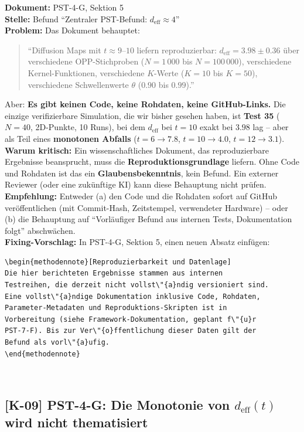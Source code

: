 \documentclass[11pt,a4paper]{article}
\newcommand{\K}[1]{\textbf{[K-#1]}}
\newcommand{\Dok}[1]{\textbf{Dokument:} #1\\}
\newcommand{\Stelle}[1]{\textbf{Stelle:} #1\\}
\newcommand{\Prob}[1]{\textbf{Problem:} #1\\}
\newcommand{\Krit}[1]{\textbf{Warum kritisch:} #1\\}
\newcommand{\Empf}[1]{\textbf{Empfehlung:} #1\\}
\newcommand{\Fix}[1]{\textbf{Fixing-Vorschlag:} #1\\}
\begin{document}
\Dok{PST-4-G, Sektion 5}
\Stelle{Befund ``Zentraler PST-Befund: $d_{\text{eff}} \approx 4$''}
\Prob{Das Dokument behauptet:
\begin{quote}
``Diffusion Maps mit $t \approx 9$--$10$ liefern reproduzierbar:
$d_{\text{eff}} = 3.98 \pm 0.36$ \"{u}ber verschiedene OPP-Stichproben
($N = 1\,000$ bis $N = 100\,000$), verschiedene Kernel-Funktionen,
verschiedene $K$-Werte ($K = 10$ bis $K = 50$), verschiedene
Schwellenwerte $\theta$ ($0.90$ bis $0.99$).''
\end{quote}
Aber: \textbf{Es gibt keinen Code, keine Rohdaten, keine
GitHub-Links.} Die einzige verifizierbare Simulation, die wir bisher
gesehen haben, ist \textbf{Test 35} ($N = 40$, 2D-Punkte, 10 Runs),
bei dem $d_{\text{eff}}$ bei $t = 10$ exakt bei $3.98$ lag -- aber als
Teil eines \textbf{monotonen Abfalls} ($t = 6 \to 7.8$, $t = 10 \to
4.0$, $t = 12 \to 3.1$).}
\Krit{Ein wissenschaftliches Dokument, das reproduzierbare Ergebnisse
beansprucht, muss die \textbf{Reproduktionsgrundlage} liefern. Ohne
Code und Rohdaten ist das ein \textbf{Glaubensbekenntnis}, kein
Befund. Ein externer Reviewer (oder eine zuk\"{u}nftige KI) kann diese
Behauptung nicht pr\"{u}fen.}
\Empf{Entweder (a) den Code und die Rohdaten sofort auf GitHub
ver\"{o}ffentlichen (mit Commit-Hash, Zeitstempel, verwendeter
Hardware) -- oder (b) die Behauptung auf ``Vorl\"{a}ufiger Befund aus
internen Tests, Dokumentation folgt'' abschw\"{a}chen.}
\Fix{In PST-4-G, Sektion 5, einen neuen Absatz einf\"{u}gen:
\begin{verbatim}
\begin{methodennote}[Reproduzierbarkeit und Datenlage]
Die hier berichteten Ergebnisse stammen aus internen
Testreihen, die derzeit nicht vollst\"{a}ndig versioniert sind.
Eine vollst\"{a}ndige Dokumentation inklusive Code, Rohdaten,
Parameter-Metadaten und Reproduktions-Skripten ist in
Vorbereitung (siehe Framework-Dokumentation, geplant f\"{u}r
PST-7-F). Bis zur Ver\"{o}ffentlichung dieser Daten gilt der
Befund als vorl\"{a}ufig.
\end{methodennote}
\end{verbatim}}

\subsection{\K{09} PST-4-G: Die Monotonie von $d_{\text{eff}}(t)$ wird nicht thematisiert}
\end{document}
